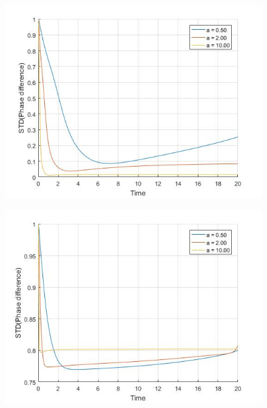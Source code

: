 \documentclass[a4paper]{scrartcl}
\begin{document}
\begin{minipage}{0.33\textwidth}
	\begin{figure}[H]
		\includegraphics[width=\textwidth]{results/6.a/N10_E_const.jpg}
	\end{figure}
\end{minipage} \hfill
\begin{minipage}{0.33\textwidth}
	\begin{figure}[H]
		\includegraphics[width=\textwidth]{results/6.a/N20_E_const.jpg}
	\end{figure}
\end{minipage}\hfill
\end{document}
